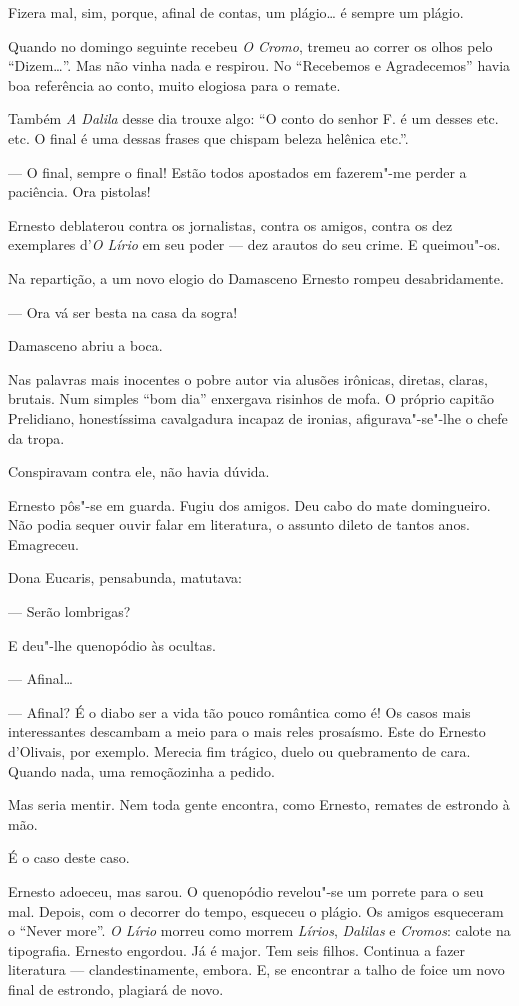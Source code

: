 Fizera mal, sim, porque, afinal de contas, um plágio\ldots{} é sempre um
plágio.

Quando no domingo seguinte recebeu \emph{O Cromo}, tremeu ao correr os
olhos pelo ``Dizem\ldots{}''. Mas não vinha nada e respirou. No ``Recebemos e
Agradecemos'' havia boa referência ao conto, muito elogiosa para o
remate.

Também \emph{A Dalila} desse dia trouxe algo: ``O conto do senhor F. é
um desses etc. etc. O final é uma dessas frases que chispam beleza
helênica etc.''.

--- O final, sempre o final! Estão todos apostados em fazerem"-me perder
a paciência. Ora pistolas!

Ernesto deblaterou contra os jornalistas, contra os amigos, contra os
dez exemplares d'\emph{O Lírio} em seu poder --- dez arautos do seu
crime. E queimou"-os.

Na repartição, a um novo elogio do Damasceno Ernesto rompeu
desabridamente.

--- Ora vá ser besta na casa da sogra!

Damasceno abriu a boca.

Nas palavras mais inocentes o pobre autor via alusões irônicas, diretas,
claras, brutais. Num simples ``bom dia'' enxergava risinhos de mofa. O
próprio capitão Prelidiano, honestíssima cavalgadura incapaz de ironias,
afigurava"-se"-lhe o chefe da tropa.

Conspiravam contra ele, não havia dúvida.

Ernesto pôs"-se em guarda. Fugiu dos amigos. Deu cabo do mate
domingueiro. Não podia sequer ouvir falar em literatura, o assunto
dileto de tantos anos. Emagreceu.

Dona Eucaris, pensabunda, matutava:

--- Serão lombrigas?

E deu"-lhe quenopódio às ocultas.

--- Afinal\ldots{}

--- Afinal? É o diabo ser a vida tão pouco romântica como é! Os casos
mais interessantes descambam a meio para o mais reles prosaísmo. Este do
Ernesto d'Olivais, por exemplo. Merecia fim trágico, duelo ou
quebramento de cara. Quando nada, uma remoçãozinha a pedido.

Mas seria mentir. Nem toda gente encontra, como Ernesto, remates de
estrondo à mão.

É o caso deste caso.

Ernesto adoeceu, mas sarou. O quenopódio revelou"-se um porrete para o
seu mal. Depois, com o decorrer do tempo, esqueceu o plágio. Os amigos
esqueceram o ``Never more''. \emph{O Lírio} morreu como morrem
\emph{Lírios}, \emph{Dalilas} e \emph{Cromos}: calote na tipografia.
Ernesto engordou. Já é major. Tem seis filhos. Continua a fazer
literatura --- clandestinamente, embora. E, se encontrar a talho de
foice um novo final de estrondo, plagiará de novo.

